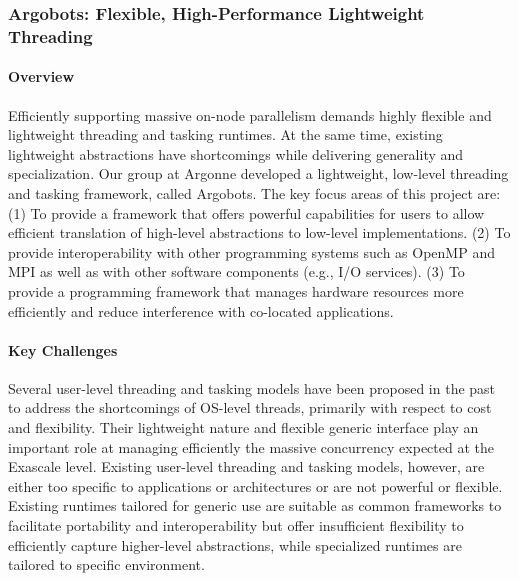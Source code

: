\subsubsection{ Argobots: Flexible, High-Performance Lightweight Threading }

\paragraph{Overview}
Efficiently supporting massive on-node parallelism demands highly
flexible and lightweight threading and tasking runtimes. At the
same time, existing lightweight abstractions have shortcomings while
delivering generality and specialization.  Our group at Argonne
developed a lightweight, low-level threading and tasking framework,
called Argobots.  The key focus areas of this project are: (1) To
provide a framework that offers powerful capabilities for users to
allow efficient translation of high-level abstractions to low-level
implementations. (2) To provide interoperability with other
programming systems such as OpenMP and MPI as well as with other
software components (e.g., I/O services). (3) To provide a programming
framework that manages hardware resources more efficiently and reduce
interference with co-located applications.

\paragraph{Key Challenges}
Several user-level threading and tasking models have been proposed in
the past to address the shortcomings of OS-level threads, primarily
with respect to cost and flexibility. Their lightweight nature and
flexible generic interface play an important role at managing
efficiently the massive concurrency expected at the Exascale level.
Existing user-level threading and tasking models, however, are either
too specific to applications or architectures or are not powerful or
flexible. Existing runtimes tailored for generic use \cite{GNUPth,
PLDI97_Taura, COSET05_Thibault, COB14_Nakashima, MTAAP08_Wheeler,
PPoPP99_Taura, SenSys06_Dunkels, TBB1, EuroPar08_Perache} are suitable
as common frameworks to facilitate portability and interoperability
but offer insufficient flexibility to efficiently capture higher-level
abstractions, while specialized runtimes \cite{ATC02_Adya,
SolarisThreads, SOSP03_von_Behren, StateThreads, PLDI07_Li,
MTAAP09_Porterfield, WMPP05_Cuvillo, IntelOMP, Nanos++, LCPC96_Kale,
PACT14_Treichler} are tailored to specific environment.

